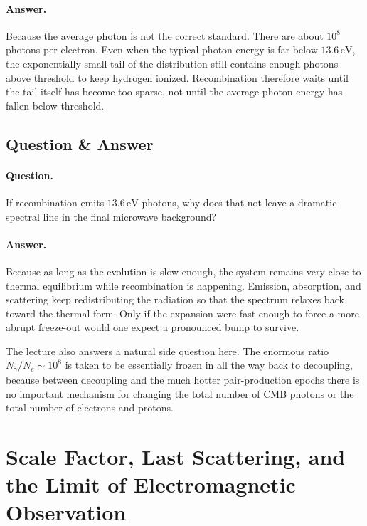 \paragraph{Answer.} Because the average photon is not the correct standard. There are about \(10^8\) photons per electron. Even when the typical photon energy is far below \(13.6\,\mathrm{eV}\), the exponentially small tail of the distribution still contains enough photons above threshold to keep hydrogen ionized. Recombination therefore waits until the tail itself has become too sparse, not until the average photon energy has fallen below threshold.

\subsection{Question \& Answer}

\paragraph{Question.} If recombination emits \(13.6\,\mathrm{eV}\) photons, why does that not leave a dramatic spectral line in the final microwave background?

\paragraph{Answer.} Because as long as the evolution is slow enough, the system remains very close to thermal equilibrium while recombination is happening. Emission, absorption, and scattering keep redistributing the radiation so that the spectrum relaxes back toward the thermal form. Only if the expansion were fast enough to force a more abrupt freeze-out would one expect a pronounced bump to survive.

The lecture also answers a natural side question here. The enormous ratio \(N_\gamma/N_e \sim 10^8\) is taken to be essentially frozen in all the way back to decoupling, because between decoupling and the much hotter pair-production epochs there is no important mechanism for changing the total number of CMB photons or the total number of electrons and protons.

\section{Scale Factor, Last Scattering, and the Limit of Electromagnetic Observation}

